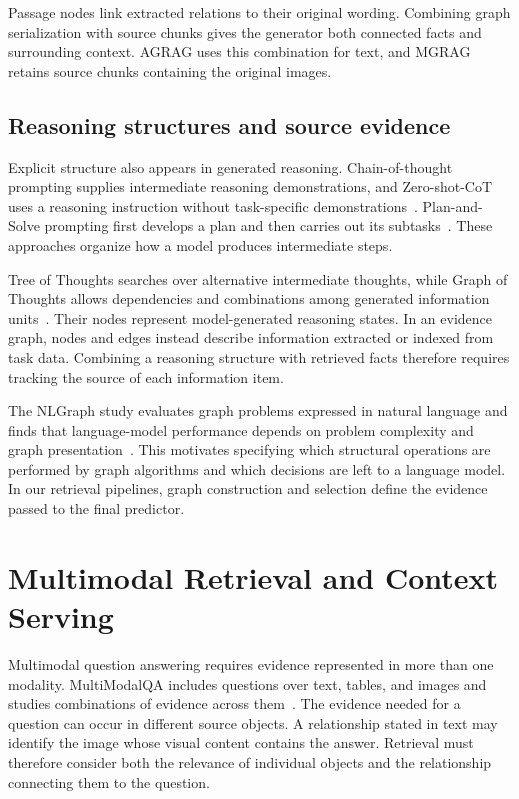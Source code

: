Passage nodes link extracted relations to their original wording. Combining graph serialization with source chunks gives the generator both connected facts and surrounding context. AGRAG uses this combination for text, and MGRAG retains source chunks containing the original images.

\subsection{Reasoning structures and source evidence}

Explicit structure also appears in generated reasoning. Chain-of-thought prompting supplies intermediate reasoning demonstrations, and Zero-shot-CoT uses a reasoning instruction without task-specific demonstrations~\cite{lit-wei2022chain,lit-kojima2022large}. Plan-and-Solve prompting first develops a plan and then carries out its subtasks~\cite{lit-wang2023plan}. These approaches organize how a model produces intermediate steps.

Tree of Thoughts searches over alternative intermediate thoughts, while Graph of Thoughts allows dependencies and combinations among generated information units~\cite{lit-yao2024tree,lit-besta2024graph}. Their nodes represent model-generated reasoning states. In an evidence graph, nodes and edges instead describe information extracted or indexed from task data. Combining a reasoning structure with retrieved facts therefore requires tracking the source of each information item.

The NLGraph study evaluates graph problems expressed in natural language and finds that language-model performance depends on problem complexity and graph presentation~\cite{lit-wang2023can}. This motivates specifying which structural operations are performed by graph algorithms and which decisions are left to a language model. In our retrieval pipelines, graph construction and selection define the evidence passed to the final predictor.

\section{Multimodal Retrieval and Context Serving}
\label{sec:background:multimodal}

Multimodal question answering requires evidence represented in more than one modality. MultiModalQA includes questions over text, tables, and images and studies combinations of evidence across them~\cite{bg-mmqa}. The evidence needed for a question can occur in different source objects. A relationship stated in text may identify the image whose visual content contains the answer. Retrieval must therefore consider both the relevance of individual objects and the relationship connecting them to the question.


